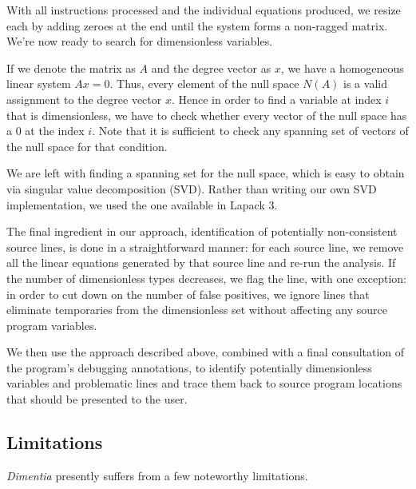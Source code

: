 \documentclass[12pt]{article}
\begin{document}
With all instructions processed and the individual equations produced, we resize each by adding zeroes at the end until the system forms a non-ragged matrix.
We're now ready to search for dimensionless variables.

If we denote the matrix as $A$ and the degree vector as $x$, we have a homogeneous linear system $Ax = 0$.
Thus, every element of the null space $N(A)$ is a valid assignment to the degree vector $x$.
Hence in order to find a variable at index $i$ that is dimensionless, we have to check whether every vector of the null space has a $0$ at the index $i$.
Note that it is sufficient to check any spanning set of vectors of the null space for that condition.

We are left with finding a spanning set for the null space, which is easy to obtain via singular value decomposition (SVD).
Rather than writing our own SVD implementation, we used the one available in Lapack 3.

The final ingredient in our approach, identification of potentially non-consistent source lines, is done in a straightforward manner: for each source line, we remove all the linear equations generated by that source line and re-run the analysis.
If the number of dimensionless types decreases, we flag the line, with one exception: in order to cut down on the number of false positives, we ignore lines that eliminate temporaries from the dimensionless set without affecting any source program variables.

We then use the approach described above, combined with a final consultation of the program's debugging annotations, to identify potentially dimensionless variables and problematic lines and trace them back to source program locations that should be presented to the user.

\subsection{Limitations}

\textit{Dimentia} presently suffers from a few noteworthy limitations.
\end{document}
